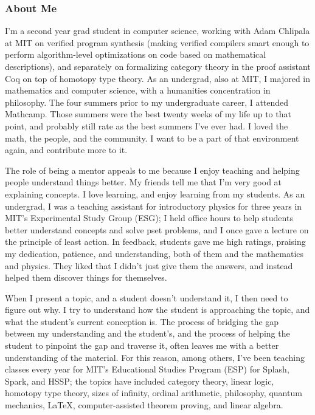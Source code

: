 \documentclass{article}
\begin{document}
\subsubsection*{About Me}
{\setlength{\parindent}{0pt}
\setlength{\parskip}{0.5\baselineskip}
I'm a second year grad student in computer science, working with Adam Chlipala at MIT on verified program synthesis (making verified compilers smart enough to perform algorithm-level optimizations on code based on mathematical descriptions), and separately on formalizing category theory in the proof assistant Coq on top of homotopy type theory.  As an undergrad, also at MIT, I majored in mathematics and computer science, with a humanities concentration in philosophy.  The four summers prior to my undergraduate career, I attended Mathcamp.  Those summers were the best twenty weeks of my life up to that point, and probably still rate as the best summers I've ever had.  I loved the math, the people, and the community.  I want to be a part of that environment again, and contribute more to it.

The role of being a mentor appeals to me because I enjoy teaching and helping people understand things better.  My friends tell me that I'm very good at explaining concepts.  I love learning, and enjoy learning from my students.  As an undergrad, I was a teaching assistant for introductory physics for three years in MIT's Experimental Study Group (ESG); I held office hours to help students better understand concepts and solve pset problems, and I once gave a lecture on the principle of least action.  In feedback, students gave me high ratings, praising my dedication, patience, and understanding, both of them and the mathematics and physics.  They liked that I didn't just give them the answers, and instead helped them discover things for themselves.

When I present a topic, and a student doesn't understand it, I then need to figure out why.  I try to understand how the student is approaching the topic, and what the student's current conception is.  The process of bridging the gap between my understanding and the student's, and the process of helping the student to pinpoint the gap and traverse it, often leaves me with a better understanding of the material.  For this reason, among others, I've been teaching classes every year for MIT's Educational Studies Program (ESP) for Splash, Spark, and HSSP; the topics have included category theory, linear logic, homotopy type theory, sizes of infinity, ordinal arithmetic, philosophy, quantum mechanics, \LaTeX, computer-assisted theorem proving, and linear algebra.

}
\end{document}
